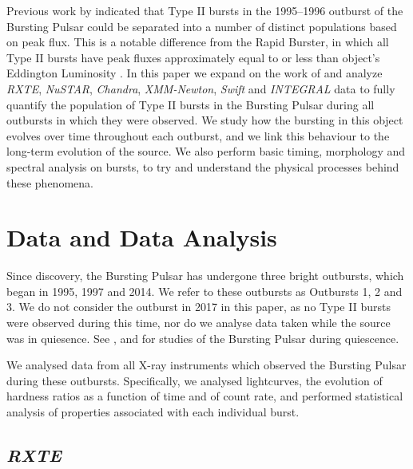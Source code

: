 \par Previous work by \citet{Giles_BP} indicated that Type II bursts in the 1995--1996 outburst of the Bursting Pulsar could be separated into a number of distinct populations based on peak flux.  This is a notable difference from the Rapid Burster, in which all Type II bursts have peak fluxes approximately equal to or less than object's Eddington Luminosity \citep{Tan_RBBursts}.  In this paper we expand on the work of \citet{Giles_BP} and analyze \textit{RXTE}, \textit{NuSTAR}, \textit{Chandra}, \textit{XMM-Newton}, \textit{Swift} and \textit{INTEGRAL} data to fully quantify the population of Type II bursts in the Bursting Pulsar during all outbursts in which they were observed.  We study how the bursting in this object evolves over time throughout each outburst, and we link this behaviour to the long-term evolution of the source.  We also perform basic timing, morphology and spectral analysis on bursts, to try and understand the physical processes behind these phenomena.  %

\section{Data and Data Analysis}

\par Since discovery, the Bursting Pulsar has undergone three bright outbursts, which began in 1995, 1997 and 2014.  We refer to these outbursts as Outbursts 1, 2 and 3.  We do not consider the outburst in 2017 in this paper, as no Type II bursts were observed during this time, nor do we analyse data taken while the source was in quiesence.  See \citet{Daigne_BPQ}, \citet{Wijnands_BPQ} and \citet{Degenaar_BPQuiescence} for studies of the Bursting Pulsar during quiescence.
\par We analysed data from all X-ray instruments which observed the Bursting Pulsar during these outbursts.  Specifically, we analysed lightcurves, the evolution of hardness ratios as a function of time and of count rate, and performed statistical analysis of properties associated with each individual burst.

\subsection{\textit{RXTE}}

